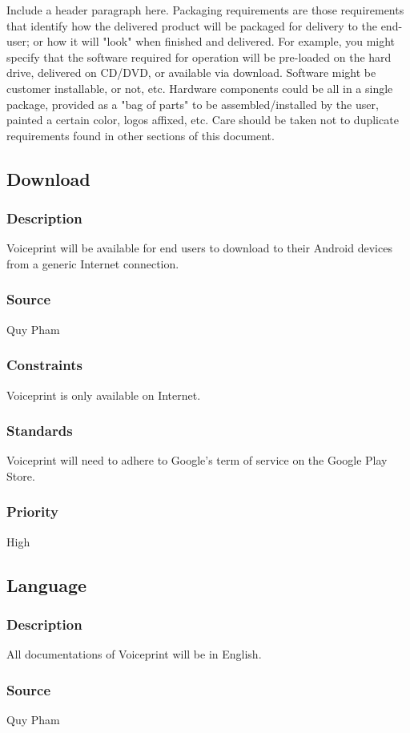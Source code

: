 Include a header paragraph here. Packaging requirements are those requirements that identify how the delivered product will be packaged for delivery to the end-user; or how it will "look" when finished and delivered. For example, you might specify that the software required for operation will be pre-loaded on the hard drive, delivered on CD/DVD, or available via download. Software might be customer installable, or not, etc. Hardware components could be all in a single package, provided as a "bag of parts" to be assembled/installed by the user, painted a certain color, logos affixed, etc. Care should be taken not to duplicate requirements found in other sections of this document.

\subsection{Download}
\subsubsection{Description}
Voiceprint will be available for end users to download to their Android devices from a generic Internet connection.
\subsubsection{Source}
Quy Pham
\subsubsection{Constraints}
Voiceprint is only available on Internet.
\subsubsection{Standards}
Voiceprint will need to adhere to Google's term of service on the Google Play Store.
\subsubsection{Priority}
High

\subsection{Language}
\subsubsection{Description}
All documentations of Voiceprint will be in English.
\subsubsection{Source}
Quy Pham
